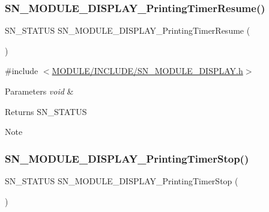 \subsubsection{\texorpdfstring{S\+N\+\_\+\+M\+O\+D\+U\+L\+E\+\_\+\+D\+I\+S\+P\+L\+A\+Y\+\_\+\+Printing\+Timer\+Resume()}{SN\_MODULE\_DISPLAY\_PrintingTimerResume()}}
{\footnotesize\ttfamily S\+N\+\_\+\+S\+T\+A\+T\+US S\+N\+\_\+\+M\+O\+D\+U\+L\+E\+\_\+\+D\+I\+S\+P\+L\+A\+Y\+\_\+\+Printing\+Timer\+Resume (\begin{DoxyParamCaption}\item[{void}]{ }\end{DoxyParamCaption})}



{\ttfamily \#include $<$\hyperlink{SN__MODULE__DISPLAY_8h}{M\+O\+D\+U\+L\+E/\+I\+N\+C\+L\+U\+D\+E/\+S\+N\+\_\+\+M\+O\+D\+U\+L\+E\+\_\+\+D\+I\+S\+P\+L\+A\+Y.\+h}$>$}


\begin{DoxyParams}{Parameters}
{\em void} & \\
\hline
\end{DoxyParams}
\begin{DoxyReturn}{Returns}
S\+N\+\_\+\+S\+T\+A\+T\+US
\end{DoxyReturn}
\begin{DoxyNote}{Note}

\end{DoxyNote}
\mbox{\label{group__DISPLAY_ga23a40fbba57f5da86b6173fe40861196}} 
\subsubsection{\texorpdfstring{S\+N\+\_\+\+M\+O\+D\+U\+L\+E\+\_\+\+D\+I\+S\+P\+L\+A\+Y\+\_\+\+Printing\+Timer\+Stop()}{SN\_MODULE\_DISPLAY\_PrintingTimerStop()}}
{\footnotesize\ttfamily S\+N\+\_\+\+S\+T\+A\+T\+US S\+N\+\_\+\+M\+O\+D\+U\+L\+E\+\_\+\+D\+I\+S\+P\+L\+A\+Y\+\_\+\+Printing\+Timer\+Stop (\begin{DoxyParamCaption}\item[{void}]{ }\end{DoxyParamCaption})}



